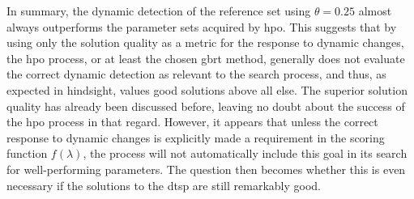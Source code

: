 In summary, the dynamic detection of the reference set using $\theta = 0.25$ almost always outperforms the parameter sets acquired by \gls{hpo}. This suggests that by using only the solution quality as a metric for the response to dynamic changes, the \gls{hpo} process, or at least the chosen \gls{gbrt} method, generally does not evaluate the correct dynamic detection as relevant to the search process, and thus, as expected in hindsight, values good solutions above all else. The superior solution quality has already been discussed before, leaving no doubt about the success of the \gls{hpo} process in that regard. However, it appears that unless the correct response to dynamic changes is explicitly made a requirement in the scoring function $f(\lambda)$, the process will not automatically include this goal in its search for well-performing parameters. The question then becomes whether this is even necessary if the solutions to the \gls{dtsp} are still remarkably good.